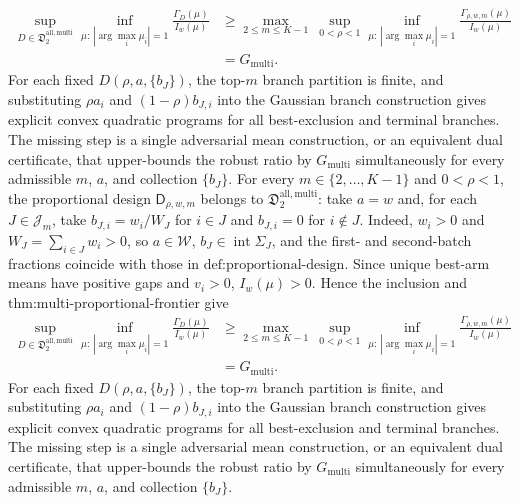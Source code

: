 \[
\begin{aligned}
 \sup_{D\in\mathfrak D_2^{\mathrm{all,multi}}}
 \inf_{\mu:\,|\arg\max_i\mu_i|=1}
 \frac{\Gamma_D(\mu)}{I_w(\mu)}
 &\ge
 \max_{2\le m\le K-1}\ \sup_{0<\rho<1}
 \inf_{\mu:\,|\arg\max_i\mu_i|=1}
 \frac{\Gamma_{\rho,w,m}(\mu)}{I_w(\mu)} \\
 &=G_{\mathrm{multi}}.
\end{aligned}
\]
For each fixed \(D(\rho,a,\{b_J\})\), the top-\(m\) branch partition is finite, and substituting \(\rho a_i\) and \((1-\rho)b_{J,i}\) into the Gaussian branch construction gives explicit convex quadratic programs for all best-exclusion and terminal branches.  The missing step is a single adversarial mean construction, or an equivalent dual certificate, that upper-bounds the robust ratio by \(G_{\mathrm{multi}}\) simultaneously for every admissible \(m\), \(a\), and collection \(\{b_J\}\).
For every \(m\in\{2,\ldots,K-1\}\) and \(0<\rho<1\), the proportional design \(\mathsf D_{\rho,w,m}\) belongs to \(\mathfrak D_2^{\mathrm{all,multi}}\): take \(a=w\) and, for each \(J\in\mathcal J_m\), take \(b_{J,i}=w_i/W_J\) for \(i\in J\) and \(b_{J,i}=0\) for \(i\notin J\).  Indeed, \(w_i>0\) and \(W_J=\sum_{i\in J}w_i>0\), so \(a\in\mathcal W\), \(b_J\in\operatorname{int}\Sigma_J\), and the first- and second-batch fractions coincide with those in \(\text{def:proportional-design}\).  Since unique best-arm means have positive gaps and \(v_i>0\), \(I_w(\mu)>0\).  Hence the inclusion and \(\text{thm:multi-proportional-frontier}\) give
\[
\begin{aligned}
 \sup_{D\in\mathfrak D_2^{\mathrm{all,multi}}}
 \inf_{\mu:\,|\arg\max_i\mu_i|=1}
 \frac{\Gamma_D(\mu)}{I_w(\mu)}
 &\ge
 \max_{2\le m\le K-1}\ \sup_{0<\rho<1}
 \inf_{\mu:\,|\arg\max_i\mu_i|=1}
 \frac{\Gamma_{\rho,w,m}(\mu)}{I_w(\mu)} \\
 &=G_{\mathrm{multi}}.
\end{aligned}
\]
For each fixed \(D(\rho,a,\{b_J\})\), the top-\(m\) branch partition is finite, and substituting \(\rho a_i\) and \((1-\rho)b_{J,i}\) into the Gaussian branch construction gives explicit convex quadratic programs for all best-exclusion and terminal branches.  The missing step is a single adversarial mean construction, or an equivalent dual certificate, that upper-bounds the robust ratio by \(G_{\mathrm{multi}}\) simultaneously for every admissible \(m\), \(a\), and collection \(\{b_J\}\).
